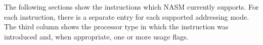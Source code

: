 %
%


The following sections show the instructions which NASM currently supports. For each
instruction, there is a separate entry for each supported addressing mode. The third
column shows the processor type in which the instruction was introduced and,
when appropriate, one or more usage flags.

%
